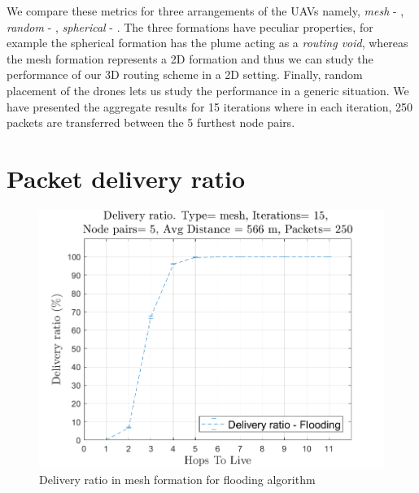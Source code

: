We compare these metrics for three arrangements of the UAVs namely, \emph{mesh} - , \emph{random} - , \emph{spherical} - . The three formations have peculiar properties, for example the spherical formation has the plume acting as a \emph{routing void}, whereas the mesh formation represents a 2D formation and thus we can study the performance of our 3D routing scheme in a 2D setting. Finally, random placement of the drones lets us study the performance in a generic situation. We have presented the aggregate results for 15 iterations where in each iteration, 250 packets are transferred between the 5 furthest node pairs.

\section{Packet delivery ratio}
\label{pdr}

\begin{figure}[hbtp]
\centering
\includegraphics[width=\simResultFigSize \textwidth]{ncsuthesis-0.6/Chapter-5/figs/fl_DR_mesh.png}
\caption{Delivery ratio in mesh formation for flooding algorithm}
\label{fig:fl_DR_mesh}
\end{figure}


